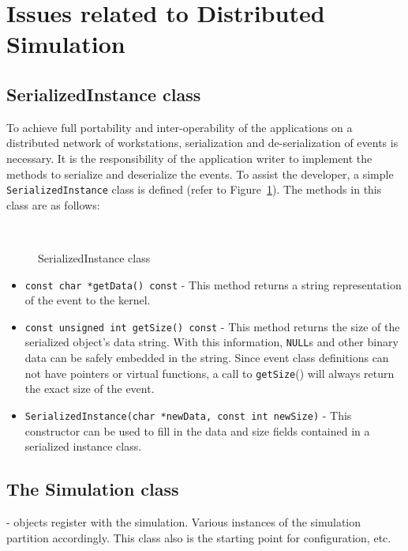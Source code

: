\documentclass[11pt]{article}
\begin{document}
\section{Issues related to Distributed Simulation}

\subsection{SerializedInstance class}\label{SerializedInstance}

To achieve full portability and inter-operability of the applications on a
distributed network of workstations, serialization and de-serialization of
events is necessary.  It is the responsibility of the application writer
to implement the methods to serialize and deserialize the events.  To
assist the developer, a simple {\tt Serialized\-Instance} class is defined
(refer to Figure~\ref{fig:SerializedInstance}).  The methods in this class
are as follows:

\begin{figure}
\begin{center}
\ 
\end{center}
\caption{SerializedInstance class}\label{fig:SerializedInstance}
\end{figure}

\begin{itemize}

\item {\tt const char *getData() const} - This method returns a string
  representation of the event to the kernel.

\item{\tt const unsigned int getSize() const} - This method returns 
  the size of the serialized object's data string.  With this information,
  {\tt NULL}s and other binary data can be safely embedded in the
  string. Since event class definitions can not have pointers or virtual
  functions, a call to {\tt getSize}() will always return the exact size of
  the event.

\item{\tt SerializedInstance(char *newData, const int newSize)} - This
  constructor can be used to fill in the data and size fields contained in
  a serialized instance class.

\end{itemize}

\subsection{The Simulation class} - objects register with the simulation.
Various instances of the simulation partition accordingly.  This class also 
is the starting point for configuration, etc.
\end{document}
